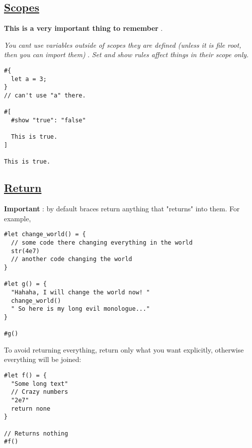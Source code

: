 \pandocbounded{}

\subsection{\texorpdfstring{\hyperref[scopes]{Scopes}}{Scopes}}\label{scopes}

\textbf{This is a very important thing to remember} .

\emph{You can\textquotesingle t use variables outside of scopes they are
defined (unless it is file root, then you can import them)} . \emph{Set
and show rules affect things in their scope only.}

\begin{verbatim}
#{
  let a = 3;
}
// can't use "a" there.

#[
  #show "true": "false"

  This is true.
]

This is true.
\end{verbatim}

\pandocbounded{}

\subsection{\texorpdfstring{\hyperref[return]{Return}}{Return}}\label{return}

\textbf{Important} : by default braces return anything that "returns"
into them. For example,

\begin{verbatim}
#let change_world() = {
  // some code there changing everything in the world
  str(4e7)
  // another code changing the world
}

#let g() = {
  "Hahaha, I will change the world now! "
  change_world()
  " So here is my long evil monologue..."
}

#g()
\end{verbatim}

\pandocbounded{}

To avoid returning everything, return only what you want explicitly,
otherwise everything will be joined:

\begin{verbatim}
#let f() = {
  "Some long text"
  // Crazy numbers
  "2e7"
  return none
}

// Returns nothing
#f()
\end{verbatim}

